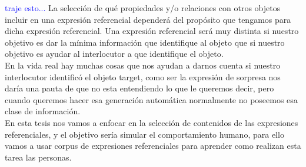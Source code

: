 \textcolor{blue}{traje esto...}
La selecci\'on de qu\'e propiedades y/o relaciones con otros objetos incluir en una expresi\'on referencial depender\'a del prop\'osito que tengamos para dicha expresi\'on referencial. Una expresi\'on referencial ser\'a muy distinta si nuestro objetivo es dar la m\'inima informaci\'on que identifique al objeto que si nuestro objetivo es ayudar al interlocutor a que identifique el objeto.\\

En la vida real hay muchas cosas que nos ayudan a darnos cuenta si nuestro interlocutor identific\'o el objeto target, como ser la expresi\'on de sorpresa nos dar\'ia una pauta de que no esta entendiendo lo que le queremos decir, pero cuando queremos hacer esa generaci\'on autom\'atica normalmente no poseemos esa clase de informaci\'on.\\

En esta tesis nos vamos a enfocar en la selecci\'on de contenidos de las expresiones referenciales, y el objetivo ser\'ia simular el comportamiento humano, para ello vamos a usar corpus de expresiones referenciales para aprender como realizan esta tarea las personas.\\

